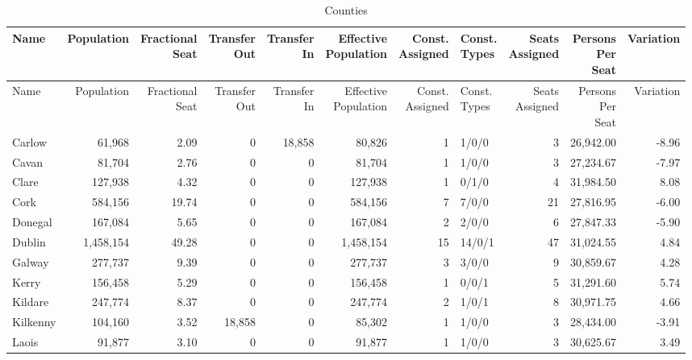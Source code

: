 \documentclass[a4paper]{article}
\begin{document}
\begin{longtable}{lrrrrrrlrrr}
\caption{Counties}
\\ \toprule
Name &Population &\shortstack{Fractional\\Seat} &\shortstack{Transfer\\Out} &\shortstack{Transfer\\In} &\shortstack{Effective\\Population} &\shortstack{Const.\\Assigned} &\shortstack{Const.\\Types} &\shortstack{Seats\\Assigned} &\shortstack{Persons\\Per\\Seat} &Variation \\ \midrule
\endfirsthead
\toprule
Name &Population &\shortstack{Fractional\\Seat} &\shortstack{Transfer\\Out} &\shortstack{Transfer\\In} &\shortstack{Effective\\Population} &\shortstack{Const.\\Assigned} &\shortstack{Const.\\Types} &\shortstack{Seats\\Assigned} &\shortstack{Persons\\Per\\Seat} &Variation \\ \midrule
\endhead
\bottomrule
\endfoot
Carlow&61,968& 2.09&0&18,858&80,826&1&1/0/0&3&26,942.00&-8.96\\ 
Cavan&81,704& 2.76&0&0&81,704&1&1/0/0&3&27,234.67&-7.97\\ 
Clare&127,938& 4.32&0&0&127,938&1&0/1/0&4&31,984.50& 8.08\\ 
Cork&584,156&19.74&0&0&584,156&7&7/0/0&21&27,816.95&-6.00\\ 
Donegal&167,084& 5.65&0&0&167,084&2&2/0/0&6&27,847.33&-5.90\\ 
Dublin&1,458,154&49.28&0&0&1,458,154&15&14/0/1&47&31,024.55& 4.84\\ 
Galway&277,737& 9.39&0&0&277,737&3&3/0/0&9&30,859.67& 4.28\\ 
Kerry&156,458& 5.29&0&0&156,458&1&0/0/1&5&31,291.60& 5.74\\ 
Kildare&247,774& 8.37&0&0&247,774&2&1/0/1&8&30,971.75& 4.66\\ 
Kilkenny&104,160& 3.52&18,858&0&85,302&1&1/0/0&3&28,434.00&-3.91\\ 
Laois&91,877& 3.10&0&0&91,877&1&1/0/0&3&30,625.67& 3.49\\ 

\end{longtable}
\end{document}
